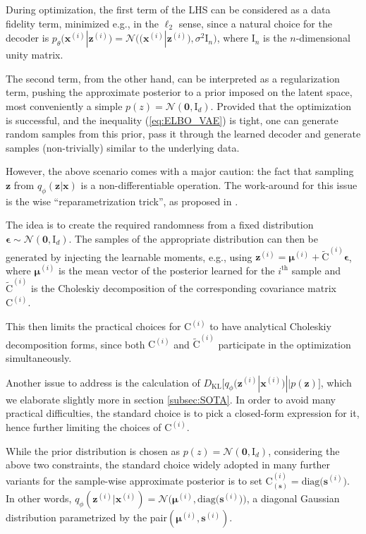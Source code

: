 \documentclass{article}
\begin{document}
During optimization, the first term of the LHS can be considered as a data fidelity term, minimized e.g., in the $\ell_2$ sense, since a natural choice for the decoder is $p_{\theta}(\mathbf{x}^{(i)}|\mathbf{z}^{(i)}) = \mathcal{N} \Big( \big( \mathbf{x}^{(i)}|\mathbf{z}^{(i)} \big) , \sigma^2 \mathrm{I}_n \Big)$, where $\mathrm{I}_n$ is the $n$-dimensional unity matrix.

The second term, from the other hand, can be interpreted as a regularization term, pushing the approximate posterior to a prior imposed on the latent space, most conveniently a simple $p(z) = \mathcal{N}(\mathbf{0}, \mathrm{I}_d)$. Provided that the optimization is successful, and the inequality (\ref{eq:ELBO_VAE}) is tight, one can generate random samples from this prior, pass it through the learned decoder and generate samples (non-trivially) similar to the underlying data.   

However, the above scenario comes with a major caution: the fact that sampling $\mathbf{z}$ from $q_{\phi}(\mathbf{z} | \mathbf{x})$ is a non-differentiable operation. The work-around for this issue is the wise ``reparametrization trick'', as proposed in \cite{VAE}. 

The idea is to create the required randomness from a fixed distribution $\boldsymbol{\epsilon} \sim \mathcal{N}(\mathbf{0}, \mathrm{I}_d)$. The samples of the appropriate distribution can then be generated by injecting the learnable moments, e.g., using $\mathbf{z}^{(i)} = \boldsymbol{\mu}^{(i)} + \tilde{\mathrm{C}}^{(i)} \boldsymbol{\epsilon}$, where $\boldsymbol{\mu}^{(i)}$ is the mean vector of the posterior learned for the $i^{\text{th}}$ sample and $\tilde{\mathrm{C}}^{(i)}$ is the Choleskiy decomposition of the corresponding covariance matrix $\mathrm{C}^{(i)}$.

This then limits the practical choices for $\mathrm{C}^{(i)}$ to have analytical Choleskiy decomposition forms, since both $\mathrm{C}^{(i)}$ and $\tilde{\mathrm{C}}^{(i)}$ participate in the optimization simultaneously.

Another issue to address is the calculation of $D_{\text{KL}}\big[ q_{\phi}(\mathbf{z}^{(i)}  | \mathbf{x}^{(i)}) || p(\mathbf{z}) \big]$, which we elaborate slightly more in section \ref{subsec:SOTA}. In order to avoid many practical difficulties, the standard choice is to pick a closed-form expression for it, hence further limiting the choices of $\mathrm{C}^{(i)}$.

While the prior distribution is chosen as $p(z) = \mathcal{N}(\mathbf{0}, \mathrm{I}_d)$, considering the above two constraints, the standard choice widely adopted in many further variants for the sample-wise approximate posterior is to set $\mathrm{C}_{(\mathbf{s})}^{(i)} = \text{diag} \big( \mathbf{s}^{(i)} \big)$. In other words,  $q_{\phi}(\mathbf{z}^{(i)}  | \mathbf{x}^{(i)}) = \mathcal{N} \Big( \boldsymbol{\mu}^{(i)}, \text{diag} \big( \mathbf{s}^{(i)} \big)  \Big)$, a diagonal Gaussian distribution parametrized by the pair$(\boldsymbol{\mu}^{(i)}, \mathbf{s}^{(i)})$.
\end{document}
